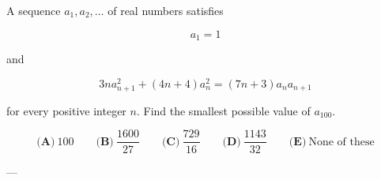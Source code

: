 A sequence \(a_1,a_2,\ldots\) of real numbers satisfies



\[
a_1=1
\]

and



\[
3na_{n+1}^2+(4n+4)a_n^2=(7n+3)a_na_{n+1}
\]

for every positive integer \(n\). Find the smallest possible value of \(a_{100}\).



\[
\textbf{(A)}\ 100
\qquad
\textbf{(B)}\ \dfrac{1600}{27}
\qquad
\textbf{(C)}\ \dfrac{729}{16}
\qquad
\textbf{(D)}\ \dfrac{1143}{32}
\qquad
\textbf{(E)}\ \text{None of these}
\]

---
